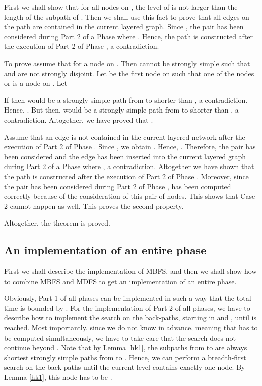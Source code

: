 \documentclass[12pt,twoside,a4paper]{article}
\def\QED{\hbox{\hskip 1pt \vrule width4pt height 6pt depth 1.5pt \hskip 1pt}}
\begin{document}
First we shall show that for all nodes  on , the level of  is not larger than
the length of the subpath  of . Then we shall use 
this fact to prove that all edges on the path  are contained in the current layered graph. 
Since , the pair  has been considered during Part 2
of a Phase  where . Hence, the path  is constructed after the execution of 
Part 2 of Phase , a contradiction.

To prove  assume that  for a node 
on . Then  cannot be strongly simple such that  and  are
not strongly disjoint. Let  be the first node on  such that one of the nodes
 or  is a node on . Let 

If  then  would be a strongly simple path from  to  
shorter than , a contradiction. Hence, . But then,
 would be a strongly simple path from  to  shorter than
, a contradiction. Altogether, we have proved that .

Assume that an edge  is not contained in the current layered network
after the execution of Part 2 of Phase . Since , we obtain
. Hence,
. Therefore, the pair  has been
considered and the edge  has been inserted into the current layered 
graph during Part 2 of a Phase  where , a contradiction. Altogether we have shown 
that the path  is constructed after the execution of Part 2 of Phase .
Moreover, since the pair  has been considered during Part 2 of Phase ,
 has been computed correctly because of the consideration of this pair of nodes.
This shows that Case 2 cannot happen as well. This proves the second property.

\medskip
Altogether, the theorem is proved.
\QED

\subsection{An implementation of an entire phase}

First we shall describe the implementation of MBFS, and then we shall show how to 
combine MBFS and MDFS to get an implementation of an entire phase.

Obviously, Part 1 of all phases can be implemented in such a way that the 
total time is bounded by . For the implementation of Part 2 of all 
phases, we have to describe how to implement the search on the back-paths,
starting in  and , until  is reached.
Most importantly, since we do not know  in advance, 
meaning that  has to be computed simultaneously, we have to 
take care that the search does not continue beyond .
Note that by Lemma \ref{hk1}, the subpaths from  to 
are always shortest strongly simple paths from  to .
Hence, we can perform a breadth-first search on the back-paths until the current 
level contains exactly one node. By Lemma \ref{hk1}, this node has to be 
. 
\end{document}
